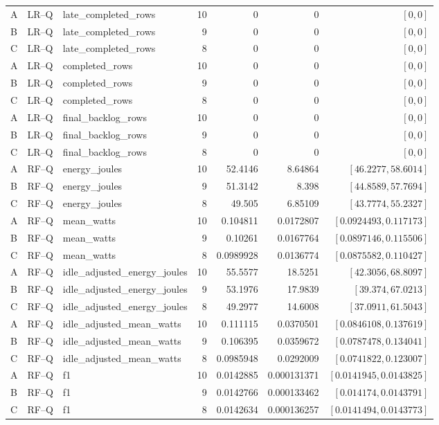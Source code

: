 \begin{longtable}{lllrrrr}
A & LR--Q & late\_completed\_rows & 10 & 0 & 0 & $[0,0]$\\
B & LR--Q & late\_completed\_rows & 9 & 0 & 0 & $[0,0]$\\
C & LR--Q & late\_completed\_rows & 8 & 0 & 0 & $[0,0]$\\
A & LR--Q & completed\_rows & 10 & 0 & 0 & $[0,0]$\\
B & LR--Q & completed\_rows & 9 & 0 & 0 & $[0,0]$\\
C & LR--Q & completed\_rows & 8 & 0 & 0 & $[0,0]$\\
A & LR--Q & final\_backlog\_rows & 10 & 0 & 0 & $[0,0]$\\
B & LR--Q & final\_backlog\_rows & 9 & 0 & 0 & $[0,0]$\\
C & LR--Q & final\_backlog\_rows & 8 & 0 & 0 & $[0,0]$\\
A & RF--Q & energy\_joules & 10 & 52.4146 & 8.64864 & $[46.2277,58.6014]$\\
B & RF--Q & energy\_joules & 9 & 51.3142 & 8.398 & $[44.8589,57.7694]$\\
C & RF--Q & energy\_joules & 8 & 49.505 & 6.85109 & $[43.7774,55.2327]$\\
A & RF--Q & mean\_watts & 10 & 0.104811 & 0.0172807 & $[0.0924493,0.117173]$\\
B & RF--Q & mean\_watts & 9 & 0.10261 & 0.0167764 & $[0.0897146,0.115506]$\\
C & RF--Q & mean\_watts & 8 & 0.0989928 & 0.0136774 & $[0.0875582,0.110427]$\\
A & RF--Q & idle\_adjusted\_energy\_joules & 10 & 55.5577 & 18.5251 & $[42.3056,68.8097]$\\
B & RF--Q & idle\_adjusted\_energy\_joules & 9 & 53.1976 & 17.9839 & $[39.374,67.0213]$\\
C & RF--Q & idle\_adjusted\_energy\_joules & 8 & 49.2977 & 14.6008 & $[37.0911,61.5043]$\\
A & RF--Q & idle\_adjusted\_mean\_watts & 10 & 0.111115 & 0.0370501 & $[0.0846108,0.137619]$\\
B & RF--Q & idle\_adjusted\_mean\_watts & 9 & 0.106395 & 0.0359672 & $[0.0787478,0.134041]$\\
C & RF--Q & idle\_adjusted\_mean\_watts & 8 & 0.0985948 & 0.0292009 & $[0.0741822,0.123007]$\\
A & RF--Q & f1 & 10 & 0.0142885 & 0.000131371 & $[0.0141945,0.0143825]$\\
B & RF--Q & f1 & 9 & 0.0142766 & 0.000133462 & $[0.014174,0.0143791]$\\
C & RF--Q & f1 & 8 & 0.0142634 & 0.000136257 & $[0.0141494,0.0143773]$\\

\end{longtable}

